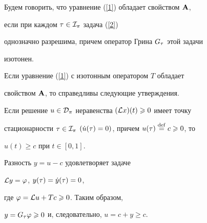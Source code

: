 \begin{defn}


Будем говорить, что уравнение (\ref{1}) обладает свойством $\bold A$,


если при каждом $\tau\in{\cal I}_\pi$ задача (\ref{2})


однозначно разрешима, причем оператор Грина $G_\tau$ этой задачи


изотонен.


\end{defn}





Если уравнение (\ref{1}) с изотонным оператором $T$ обладает


свойством $\bold A$, то справедливы следующие утверждения.





\begin{lem}


\label{lem3}


Если решение $u\in{\cal D}_\pi$ неравенства $({\cal L} x)(t)\geqslant 0$ имеет точку


стационарности $\tau\in{\cal I}_\pi$ $(\Dot u(\tau)=0)$, причем $u(\tau)\overset{\mathrm{def}}{=}{} c\geqslant0$, то


$u(t)\ge c$ при $t\in[0,1]$.


\end{lem}





\begin{pf}


Разность $y=u-c$ удовлетворяет задаче


${\cal L} y=\varphi$, $y(\tau)=\Dot y(\tau)=0$,


где $\varphi={\cal L} u+Tc\geqslant0$. Таким образом,


$y=G_\tau\varphi\geqslant0$ и, следовательно, $u=c+y\ge c$.


\end{pf}





